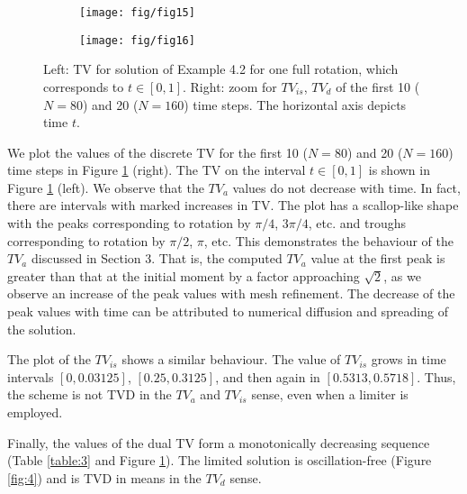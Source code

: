\documentclass[reqno,a4paper,12pt]{amsart}
\begin{document}
\begin{figure}[htb!]
\centering
\begin{subfigure}[b]{0.45\textwidth}
         \centering
         \texttt{[image: fig/fig15]}
     \end{subfigure} \quad
     \begin{subfigure}[b]{0.45\textwidth}
         \centering
         \texttt{[image: fig/fig16]}
     \end{subfigure}
     \hfill
    
        \caption{Left: TV for solution of Example 4.2 for one full rotation, which corresponds to $t \in [0,1]$. Right: zoom for $TV_{is}$, $TV_d$ of the first 10 ($N = 80$) and 20 ($N = 160$) time steps. The horizontal axis depicts time $t$. }
        \label{fig:5}
\end{figure}

We plot the values of the discrete TV for the first 10 ($N=80$) and 20 ($N=160$) time steps in Figure \ref{fig:5} (right). The TV on the interval $t\in [0,1]$ is shown in Figure \ref{fig:5} (left). We observe that the $TV_a$ values do not decrease with time. In fact, there are intervals with marked increases in TV. The plot has a scallop-like shape with the peaks corresponding to rotation by $\pi/4$, $3\pi/4$, etc. and troughs corresponding to rotation by $\pi/2$, $\pi$, etc. This demonstrates the behaviour of the $TV_a$ discussed in Section 3. That is, the computed $TV_a$ value at the first peak is greater than that at the initial moment by a factor approaching $\sqrt{2}$, as we observe an increase of the peak values with mesh refinement. The decrease of the peak values with time can be attributed to numerical diffusion and spreading of the solution.

The plot of the $TV_{is}$ shows a similar behaviour. The value of $TV_{is}$ grows in time intervals $[0, 0.03125]$,  $[0.25,0.3125]$, and then again in $[0.5313,0.5718]$. Thus, the scheme is not TVD in the $TV_a$ and $TV_{is}$ sense, even when a limiter is employed.

Finally, the values of the dual TV form a monotonically decreasing sequence (Table \ref{table:3} and Figure \ref{fig:5}). The limited solution is oscillation-free (Figure \ref{fig:4}) and is TVD in means in the $TV_d$ sense. 
\end{document}

